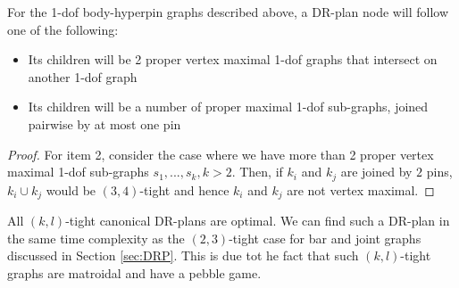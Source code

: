 \begin{observation}
    For the 1-dof body-hyperpin graphs described above, a DR-plan node will follow one of the following:

    \begin{itemize}
        \item Its children will be 2 proper vertex maximal 1-dof graphs that intersect on another 1-dof graph
        \item Its children will be a number of proper maximal 1-dof sub-graphs, joined pairwise by at most one pin
    \end{itemize}
\end{observation}

\begin{proof}

    For item 2, consider the case where we have more than 2 proper vertex maximal 1-dof sub-graphs $s_1, ..., s_k, k > 2$. Then, if $k_i$ and $k_j$ are joined by $2$ pins, $k_i \cup k_j$ would be $(3,4)$-tight and hence $k_i$ and $k_j$ are not vertex maximal.
\end{proof}

\begin{remark}
\label{rem:1dofcanon}

    All $(k,l)$-tight canonical DR-plans are optimal. We can find such a DR-plan in the same time complexity as the $(2,3)$-tight case for bar and joint graphs discussed in Section \ref{sec:DRP}. This is due tot he fact that such $(k,l)$-tight graphs are matroidal and have a pebble game.
\end{remark}

